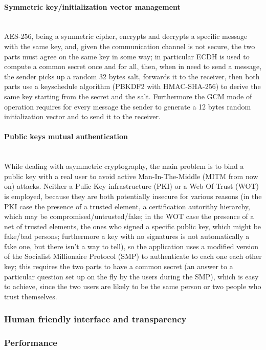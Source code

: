 \documentclass[a4paper,12pt]{article}
\begin{document}
\paragraph{Symmetric key/initialization vector management} \hspace{0pt} \\
\small{AES-256, being a symmetric cipher, encrypts and decrypts a specific message with the same key, and, given the communication channel is not secure, the two parts must agree on the same key in some way; in particular ECDH is used to compute a common secret once and for all, then, when in need to send a message, the sender picks up a random 32 bytes salt, forwards it to the receiver, then both parts use a keyschedule algorithm (PBKDF2 with HMAC-SHA-256) to derive the same key starting from the secret and the salt. Furthermore the GCM mode of operation requires for every message the sender to generate a 12 bytes random initialization vector and to send it to the receiver.}
\paragraph{Public keys mutual authentication} \hspace{0pt} \\
\small{While dealing with asymmetric cryptography, the main problem is to bind a public key with a real user to avoid active Man-In-The-Middle (MITM from now on) attacks. Neither a Pulic Key infrastructure (PKI) or a Web Of Trust (WOT) is employed, because they are both potentially insecure for various reasons (in the PKI case the presence of a trusted element, a certification autorithy hierarchy, which may be compromised/untrusted/fake; in the WOT case the presence of a net of trusted elements, the ones who signed a specific public key, which might be fake/bad persons; furthermore a key with no signatures is not automatically a fake one, but there isn't a way to tell), so the application uses a modified version of the Socialist Millionaire Protocol (SMP) to authenticate to each one each other key; this requires the two parts to have a common secret (an answer to a particular question set up on the fly by the users during the SMP), which is easy to achieve, since the two users are likely to be the same person or two people who trust themselves.}
\subsubsection{Human friendly interface and transparency}
\subsubsection{Performance}
\end{document}
